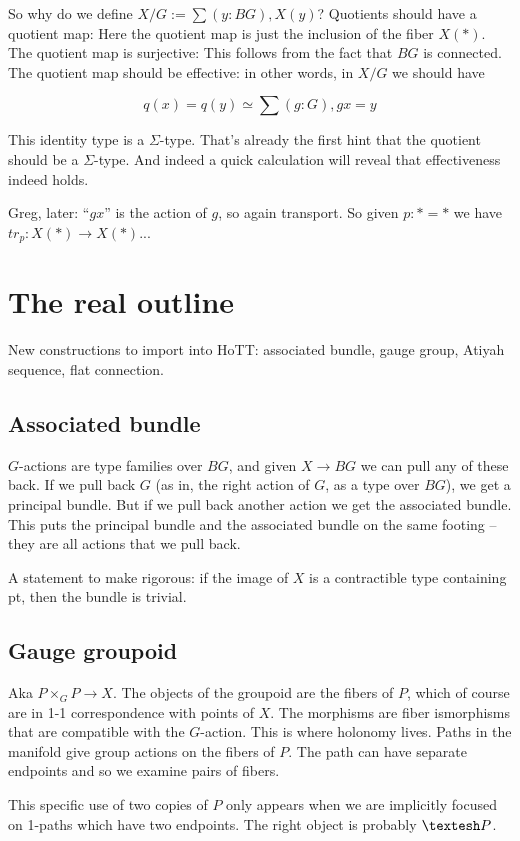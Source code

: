 \documentclass[12pt]{article}
\newcommand{\shape}{\ensuremath{\text{\textesh}}}
\begin{document}
So why do we define $X/G := \sum (y : BG), X(y)$? Quotients should have a quotient map: Here the quotient map is just the inclusion of the fiber $X(*)$. The quotient map is surjective: This follows from the fact that $BG$ is connected. The quotient map should be effective: in other words, in $X/G$ we should have

$$q(x)=q(y) \simeq \sum (g:G), gx=y$$

This identity type is a $\Sigma$-type. That's already the first hint that the quotient should be a $\Sigma$-type. And indeed a quick calculation will reveal that effectiveness indeed holds.

Greg, later: ``$gx$'' is the action of $g$, so again transport. So given $p:*=*$ we have $tr_p:X(*) \to X(*)$...

\section{The real outline}
New constructions to import into HoTT: associated bundle, gauge group, Atiyah sequence, flat connection.
\subsection{Associated bundle}
$G$-actions are type families over $BG$, and given $X\to BG$ we can pull any of these back. If we pull back $G$ (as in, the right action of $G$, as a type over $BG$), we get a principal bundle. But if we pull back another action we get the associated bundle. This puts the principal bundle and the associated bundle on the same footing -- they are all actions that we pull back.

A statement to make rigorous: if the image of $X$ is a contractible type containing pt, then the bundle is trivial.
\subsection{Gauge groupoid}
Aka $P\times_G P \to X$. The objects of the groupoid are the fibers of $P$, which of course are in 1-1 correspondence with points of $X$. The morphisms are fiber ismorphisms that are compatible with the $G$-action. This is where holonomy lives. Paths in the manifold give group actions on the fibers of $P$. The path can have separate endpoints and so we examine pairs of fibers.

This specific use of two copies of $P$ only appears when we are implicitly focused on 1-paths which have two endpoints. The right object is probably $\shape P$.
\end{document}
